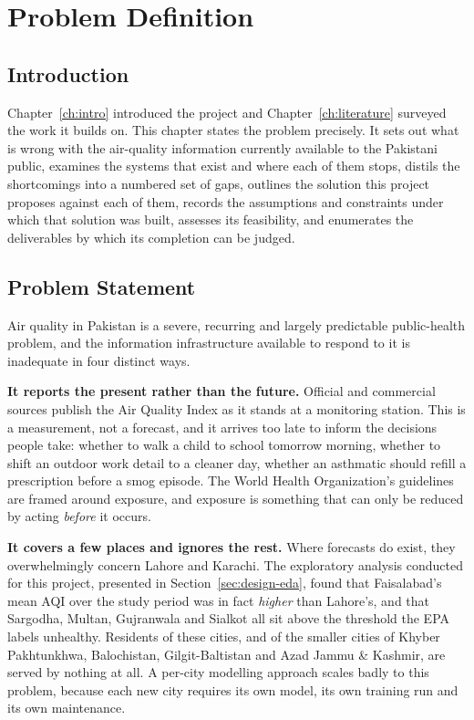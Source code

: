 \chapter{Problem Definition}
\label{ch:problem}

\section{Introduction}
Chapter~\ref{ch:intro} introduced the project and Chapter~\ref{ch:literature}
surveyed the work it builds on. This chapter states the problem precisely. It
sets out what is wrong with the air-quality information currently available to
the Pakistani public, examines the systems that exist and where each of them
stops, distils the shortcomings into a numbered set of gaps, outlines the
solution this project proposes against each of them, records the assumptions and
constraints under which that solution was built, assesses its feasibility, and
enumerates the deliverables by which its completion can be judged.

\section{Problem Statement}
Air quality in Pakistan is a severe, recurring and largely predictable
public-health problem, and the information infrastructure available to respond to
it is inadequate in four distinct ways.

\textbf{It reports the present rather than the future.} Official and commercial
sources publish the Air Quality Index as it stands at a monitoring station. This
is a measurement, not a forecast, and it arrives too late to inform the decisions
people take: whether to walk a child to school tomorrow morning, whether to shift
an outdoor work detail to a cleaner day, whether an asthmatic should refill a
prescription before a smog episode. The World Health Organization's
guidelines~\cite{ref:who} are framed around exposure, and exposure is something
that can only be reduced by acting \emph{before} it occurs.

\textbf{It covers a few places and ignores the rest.} Where forecasts do exist,
they overwhelmingly concern Lahore and Karachi. The exploratory analysis
conducted for this project, presented in Section~\ref{sec:design-eda}, found that
Faisalabad's mean AQI over the study period was in fact \emph{higher} than
Lahore's, and that Sargodha, Multan, Gujranwala and Sialkot all sit above the
threshold the EPA labels unhealthy. Residents of these cities, and of the
smaller cities of Khyber Pakhtunkhwa, Balochistan, Gilgit-Baltistan and Azad
Jammu \& Kashmir, are served by nothing at all. A per-city modelling approach
scales badly to this problem, because each new city requires its own model, its
own training run and its own maintenance.

